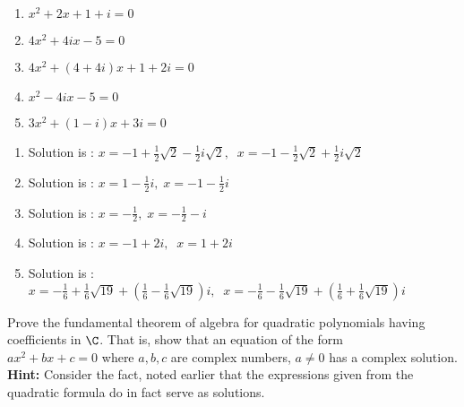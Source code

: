 \begin{enumialphparenastyle}
\begin{ex}
\begin{enumerate}
\item $x^{2}+2x+1+i=0$

\item $4x^{2}+4ix-5=0$

\item $4x^{2}+\left( 4+4i\right) x+1+2i=0$

\item $x^{2}-4ix-5=0$

\item $3x^{2}+\left( 1-i\right) x+3i=0$
\end{enumerate}
\begin{sol}
\begin{enumerate}
\item Solution is : $x=-1+\frac{1}{2}\sqrt{2}-\frac{1}{2}i
\sqrt{2},\;\;x=-1-\frac{1}{2}\sqrt{2}+\frac{1}{2}i\sqrt{2}$
\item Solution is : $x=1-\frac{1}{2}i,\;x=-1-\frac{1}{2}i$
\item Solution is : $x=-\frac{1}{2},\;x=-\frac{1}{2}-i$
\item Solution is : $x=-1+2i,\;\;x=1+2i$
\item Solution is : $x=-\frac{1}{6}+\frac{1}{6}\sqrt{19}+\left( \frac{1}{6}-\frac{1}{6}\sqrt{19}\right) i,\;\;x=-\frac{1}{6}-\frac{1}{6}\sqrt{19}+\left( \frac{1}{6}+\frac{1}{6}\sqrt{19}\right)i$
\end{enumerate}
\end{sol}
\end{ex}



\begin{ex} \label{exercomplex3}Prove the fundamental theorem of algebra for
quadratic polynomials having coefficients in $\C$. That is, show
that an equation of the form \\ $ax^{2}+bx+c=0$ where $a,b,c$ are complex
numbers, $a\neq 0$ has a complex solution. \textbf{Hint: }Consider the fact,
noted earlier that the expressions given from the quadratic formula do in
fact serve as solutions. 
\end{ex}

\end{enumialphparenastyle}